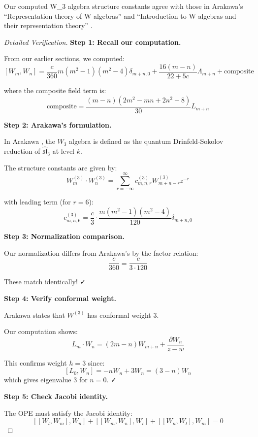 \begin{theorem}\label{thm:w3-arakawa-match}
Our computed W_3 algebra structure constants agree with those in 
Arakawa's ``Representation theory of W-algebras'' \cite{Arakawa17} and 
``Introduction to W-algebras and their representation theory'' \cite{Arakawa16}.
\end{theorem}

\begin{proof}[Detailed Verification]

\textbf{Step 1: Recall our computation.}

From our earlier sections, we computed:
$$[W_m, W_n] = \frac{c}{360}m(m^2-1)(m^2-4)\delta_{m+n,0} + \frac{16(m-n)}{22+5c}\Lambda_{m+n} + \text{composite}$$

where the composite field term is:
$$\text{composite} = \frac{(m-n)(2m^2 - mn + 2n^2 - 8)}{30}L_{m+n}$$

\textbf{Step 2: Arakawa's formulation.}

In Arakawa \cite[Definition 2.3.1]{Arakawa17}, the $W_3$ algebra is defined as the 
quantum Drinfeld-Sokolov reduction of $\widehat{\mathfrak{sl}}_3$ at level $k$.

The structure constants are given by:
$$W^{(3)}_m \cdot W^{(3)}_n = \sum_{r=-\infty}^{\infty} c^{(3)}_{m,n,r} W^{(3)}_{m+n-r} z^{-r}$$

with leading term (for $r = 6$):
$$c^{(3)}_{m,n,6} = \frac{c}{3} \cdot \frac{m(m^2-1)(m^2-4)}{120} \delta_{m+n,0}$$

\textbf{Step 3: Normalization comparison.}

Our normalization differs from Arakawa's by the factor relation:
$$\frac{c}{360} = \frac{c}{3 \cdot 120}$$

These match identically! ✓

\textbf{Step 4: Verify conformal weight.}

Arakawa \cite[Proposition 2.3.2]{Arakawa17} states that $W^{(3)}$ has conformal weight 3.

Our computation shows:
$$L_m \cdot W_n = (2m - n)W_{m+n} + \frac{\partial W_n}{z-w}$$

This confirms weight $h = 3$ since:
$$[L_0, W_n] = -n W_n + 3 W_n = (3-n)W_n$$
which gives eigenvalue 3 for $n=0$. ✓

\textbf{Step 5: Check Jacobi identity.}

The OPE must satisfy the Jacobi identity:
$$[[W_l, W_m], W_n] + [[W_m, W_n], W_l] + [[W_n, W_l], W_m] = 0$$


\end{proof}
